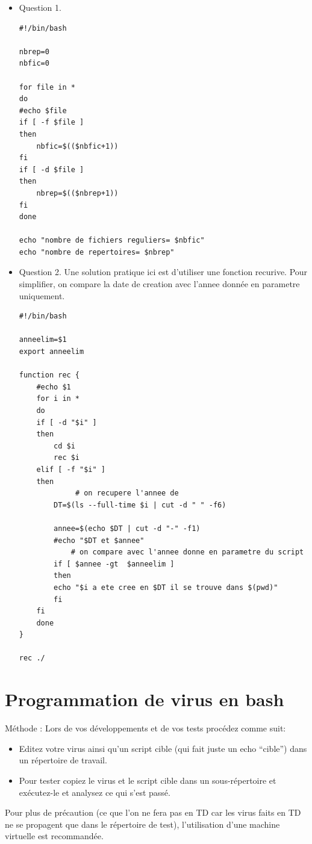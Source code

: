 \documentclass[a4paper,11pt]{article}
\theoremstyle{plain}
\theoremstyle{definition}
\begin{document}
\begin{correction}
\begin{itemize}
\item Question 1.
\begin{verbatim}
#!/bin/bash

nbrep=0
nbfic=0

for file in * 
do
#echo $file
if [ -f $file ]
then
    nbfic=$(($nbfic+1))
fi
if [ -d $file ]
then
    nbrep=$(($nbrep+1))
fi
done 

echo "nombre de fichiers reguliers= $nbfic"
echo "nombre de repertoires= $nbrep"
\end{verbatim}

\item Question 2. Une solution pratique ici est d'utiliser une fonction recurive. Pour simplifier, on compare la date de creation avec l'annee donnée en parametre uniquement.

\begin{verbatim}
#!/bin/bash 

anneelim=$1
export anneelim

function rec {
    #echo $1 
    for i in *
    do
	if [ -d "$i" ]
	then
	    cd $i	    
	    rec $i
	elif [ -f "$i" ]
	then
             # on recupere l'annee de
	    DT=$(ls --full-time $i | cut -d " " -f6) 

	    annee=$(echo $DT | cut -d "-" -f1)
	    #echo "$DT et $annee"
            # on compare avec l'annee donne en parametre du script
	    if [ $annee -gt  $anneelim ]
	    then
		echo "$i a ete cree en $DT il se trouve dans $(pwd)"
	    fi
	fi
    done
}  

rec ./

\end{verbatim}
\end{itemize}
\end{correction}


\section{Programmation de virus en bash}

{\Large Méthode :} Lors de vos développements et de vos tests procédez comme suit:
\begin{itemize}
\item Editez votre virus ainsi qu'un script cible (qui fait juste un echo ``cible'') dans un répertoire de travail.
\item Pour tester copiez le virus et le script cible dans un sous-répertoire et exécutez-le et analysez ce qui s'est passé.
\end{itemize}
Pour plus de précaution (ce que l'on ne fera pas en TD car les virus faits en TD ne se propagent que dans le répertoire de test), l'utilisation d'une machine virtuelle est recommandée.
\end{document}

